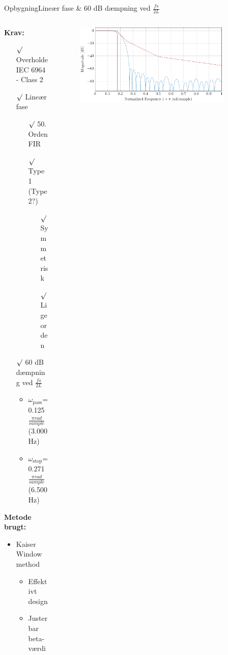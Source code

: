 \begin{frame}{Opbygning}{Lineær fase \& 60 dB dæmpning ved $\frac{fs}{2L}$}

\begin{columns}
  \begin{column}{0.5\textwidth}
\textbf{Krav:}
\begin{itemize}
\item[$\surd$] Overholde IEC 6964 - Class 2
\item[$\surd$] Lineær fase
\begin{itemize}
\item[$\surd$] 50. Orden FIR
\item[$\surd$] Type 1 (Type 2?)
\begin{itemize}
\item[$\surd$] Symmetrisk
\item[$\surd$] Lige orden
\end{itemize}
\end{itemize}
\item[$\surd$] 60 dB dæmpning ved $\frac{fs}{2L}$
\begin{itemize}
\item $\omega_{\text{pass}}$= 0.125 $\frac{\pi rad}{sample} $ (3.000Hz)
\item $\omega_{\text{stop}}$= 0.271 $\frac{\pi rad}{sample} $ (6.500Hz)
\end{itemize}
\end{itemize}
\textbf{Metode brugt:}
\begin{itemize}
\item Kaiser Window method
\begin{itemize}
\item Effektivt design
\item Justerbar beta-værdi
\end{itemize}
\end{itemize}
  \end{column}
  \hspace*{-15mm}  
  \begin{column}{0.6\textwidth}

\begin{figure}
\centering
\includegraphics[width=0.9\textwidth]{Band1Filt}
\end{figure}
  \end{column}
\end{columns}
\end{frame}

